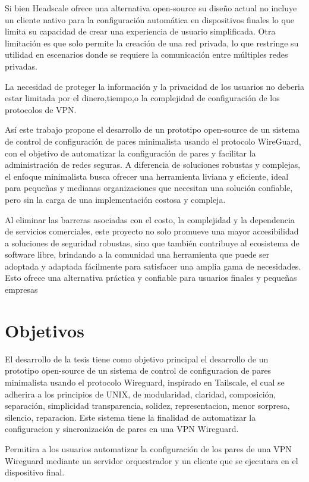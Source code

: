 \documentclass[letterpaper,12pt,oneside]{book}
\begin{document}
Si bien Headscale ofrece una alternativa open-source su diseño actual no incluye un cliente nativo para la configuración automática en dispositivos finales lo que limita su capacidad de crear una experiencia de usuario simplificada. Otra limitación es que solo permite la creación de una red privada, lo que restringe su utilidad en escenarios donde se requiere la comunicación entre múltiples redes privadas.

La necesidad de proteger la información y la privacidad de los usuarios no deberia estar limitada por el dinero,tiempo,o la complejidad de configuración de los protocolos de VPN. 

Así este trabajo propone el desarrollo de un prototipo open-source de un sistema de control de configuración de pares minimalista usando el protocolo WireGuard, con el objetivo de automatizar la configuración de pares y facilitar la administración de redes seguras. A diferencia de soluciones robustas y complejas, el enfoque minimalista busca ofrecer una herramienta liviana y eficiente, ideal para pequeñas y medianas organizaciones que necesitan una solución confiable, pero sin la carga de una implementación costosa y compleja.

Al eliminar las barreras asociadas con el costo, la complejidad y la dependencia de servicios comerciales, este proyecto no solo promueve una mayor accesibilidad a soluciones de seguridad robustas, sino que también contribuye al ecosistema de software libre, brindando a la comunidad una herramienta que puede ser adoptada y adaptada fácilmente para satisfacer una amplia gama de necesidades. Esto ofrece una alternativa práctica y confiable para usuarios finales y pequeñas empresas

\section{Objetivos}

El desarrollo de la tesis tiene como objetivo principal el desarrollo de un prototipo open-source de un sistema de control de configuracion de pares minimalista usando el protocolo Wireguard, inspirado en Tailscale, el cual se adherira a los principios de UNIX, de modularidad, claridad, composición, separación, simplicidad transparencia, solidez, representacion, menor sorpresa, silencio, reparacion. Este sistema tiene la finalidad de automatizar la configuracion y sincronización de pares en una VPN Wireguard. 

Permitira a los usuarios automatizar la configuración de los pares de una VPN Wireguard mediante un servidor orquestrador y un cliente que se ejecutara en el dispositivo final. 
\end{document}
